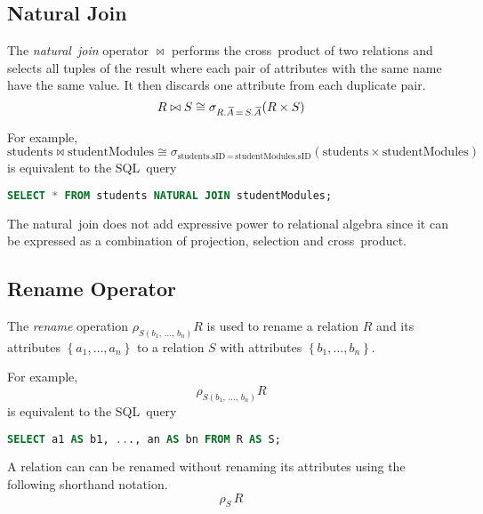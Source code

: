 \subsection{Natural Join}

The \emph{natural~join} operator \( \bowtie \) performs the cross~product of two relations and selects all tuples of the result where each pair of attributes with the same name have the same value.
It then discards one attribute from each duplicate pair.
\begin{equation*}
  R \bowtie S \cong \sigma_{R.{}\mkern3mu\overline{\mkern-3muA}\,=\,S.{}\mkern3mu\overline{\mkern-3muA}}\!\left( R \times S \right)
\end{equation*}

For example,
\begin{equation*}
  \text{students} \bowtie \text{studentModules} \cong \sigma_{\text{students.sID}\,=\,\text{studentModules.sID}}\!\left( \text{students} \times \text{studentModules} \right)
\end{equation*}
is equivalent to the SQL~query
\begin{lstlisting}[language={SQL}]
SELECT * FROM students NATURAL JOIN studentModules;
\end{lstlisting}

The natural~join does not add expressive power to relational algebra since it can be expressed as a combination of projection, selection and cross~product.

\subsection{Rename Operator}

The \emph{rename} operation \( \rho_{S\left( b_1,\,\ldots,\,b_n \right)} R \) is used to rename a relation \( R \) and its attributes \( \left\{ a_1, \ldots, a_n \right\} \) to a relation \( S \) with attributes \( \left\{ b_1, \ldots, b_n \right\} \).

For example,
\begin{equation*}
  \rho_{S\left( b_1,\,\ldots,\,b_n \right)} R
\end{equation*}
is equivalent to the SQL~query
\begin{lstlisting}[language={SQL}]
SELECT a1 AS b1, ..., an AS bn FROM R AS S;
\end{lstlisting}

A relation can can be renamed without renaming its attributes using the following shorthand notation.
\begin{equation*}
  \rho_{S}\,R
\end{equation*}

